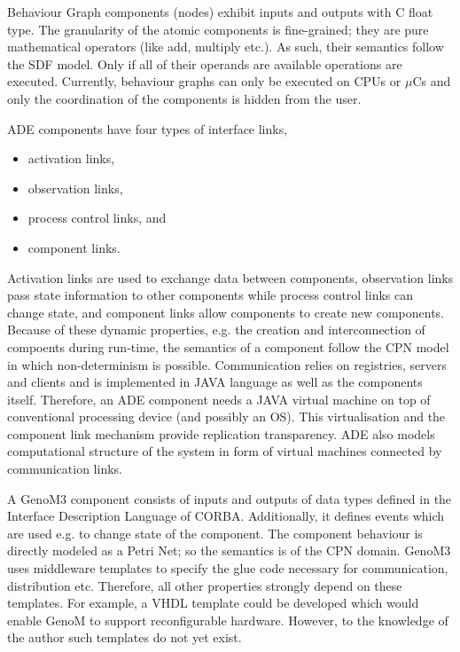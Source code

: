 \documentclass[a4paper,twocolumn]{esapub2005} %
\begin{document}
Behaviour Graph components (nodes) exhibit inputs and outputs with C float type.
The granularity of the atomic components is fine-grained; they are pure mathematical operators (like add, multiply etc.).
As such, their semantics follow the SDF model.
Only if all of their operands are available operations are executed.
Currently, behaviour graphs can only be executed on CPUs or $\mu$Cs and only the coordination of the components is hidden from the user.

ADE components have four types of interface links,
\begin{itemize}
    \item activation links,
    \item observation links,
    \item process control links, and
    \item component links.
\end{itemize}
Activation links are used to exchange data between components,
observation links pass state information to other components while process control links can change state,
and component links allow components to create new components.
Because of these dynamic properties, e.g. the creation and interconnection of compoents during run-time, the semantics of a component follow the CPN model in which non-determinism is possible.
Communication relies on registries, servers and clients and is implemented in JAVA language as well as the components itself.
Therefore, an ADE component needs a JAVA virtual machine on top of conventional processing device (and possibly an OS).
This virtualisation and the component link mechanism provide replication transparency.
ADE also models computational structure of the system in form of virtual machines connected by communication links.

A GenoM3 component consists of inputs and outputs of data types defined in the Interface Description Language of CORBA.
Additionally, it defines events which are used e.g. to change state of the component.
The component behaviour is directly modeled as a Petri Net; so the semantics is of the CPN domain.
GenoM3 uses middleware templates to specify the glue code necessary for communication, distribution etc.
Therefore, all other properties strongly depend on these templates.
For example, a VHDL template could be developed which would enable GenoM to support reconfigurable hardware.
However, to the knowledge of the author such templates do not yet exist.
\end{document}
